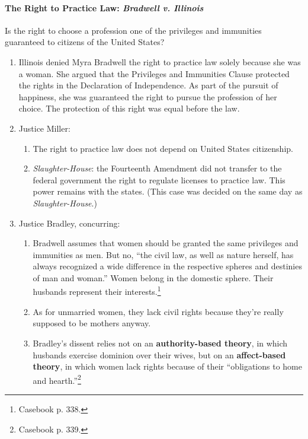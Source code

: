 \paragraph{The Right to Practice Law: \emph{Bradwell v. Illinois}}

Is the right to choose a profession one of the privileges and immunities 
guaranteed to citizens of the United States?

\begin{enumerate}
    \item Illinois denied Myra Bradwell the right to practice law solely 
    because she was a woman. She argued that the Privileges and Immunities 
    Clause protected the rights in the Declaration of Independence. As part of 
    the pursuit of happiness, she was guaranteed the right to pursue the 
    profession of her choice. The protection of this right was equal before 
    the law.
    \item Justice Miller:
    \begin{enumerate}
        \item The right to practice law does not depend on United States 
        citizenship.
        \item \emph{Slaughter-House}: the Fourteenth Amendment did not 
        transfer to the federal government the right to regulate licenses to 
        practice law. This power remains with the states. (This case was 
        decided on the same day as \emph{Slaughter-House}.)
    \end{enumerate}
    \item Justice Bradley, concurring:
    \begin{enumerate}
        \item Bradwell assumes that women should be granted the same 
        privileges and immunities as men. But no, ``the civil law, as well as 
        nature herself, has always recognized a wide difference in the 
        respective spheres and destinies of man and woman.'' Women belong in 
        the domestic sphere. Their husbands represent their 
        interests.\footnote{Casebook p. 338.}
        \item As for unmarried women, they lack civil rights because they're 
        really supposed to be mothers anyway.
        \item Bradley's dissent relies not on an \textbf{authority-based 
        theory}, in which husbands exercise dominion over their wives, but on 
        an \textbf{affect-based theory}, in which women lack rights because of 
        their ``obligations to home and hearth.''\footnote{Casebook p. 339.}
    \end{enumerate}
\end{enumerate}

